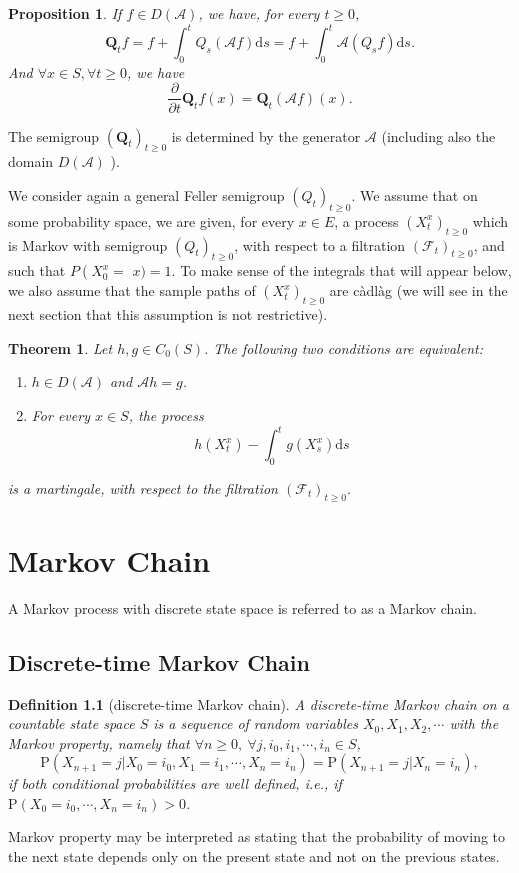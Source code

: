 \documentclass{report}
\newtheorem{definition}{Definition}[section]
\newtheorem{proposition}{Proposition}[section]
\newtheorem{theorem}{Theorem}[section]
\theoremstyle{nonumberplain}
\begin{document}
\begin{proposition}
	If $f\in D(\mathcal{A})$, we have, for every $t \ge 0$,
	\[
		\mathbf{Q}_t f=f+\int_0^t Q_s(\mathcal{A} f) \mathrm{d} s=f+\int_0^t \mathcal{A}\left(Q_s f\right) \mathrm{d} s.
	\] 
	And $\forall x \in S, \forall t \ge 0$, we have
	\[
		\frac{\partial}{\partial t} \mathbf{Q}_t f(x) = \mathbf{Q}_t\left( \mathcal{A}f \right)(x).
	\]
\end{proposition}
The semigroup $\left(\mathbf{Q}_t\right)_{t \ge 0}$ is determined by the generator $\mathcal{A}$ (including also the domain $D(\mathcal{A})$ ).

We consider again a general Feller semigroup $\left(Q_t\right)_{t \geq 0}$. We assume that on some probability space, we are given, for every $x \in E$, a process $\left(X_t^x\right)_{t \geq 0}$ which is Markov with semigroup $\left(Q_t\right)_{t \geq 0}$, with respect to a filtration $\left(\mathcal{F}_t\right)_{t \geq 0}$, and such that $P\left(X_0^x=\right.$ $x)=1$. To make sense of the integrals that will appear below, we also assume that the sample paths of $\left(X_t^x\right)_{t \geq 0}$ are càdlàg (we will see in the next section that this assumption is not restrictive).
\begin{theorem}
	Let $h, g \in C_0(S)$. The following two conditions are equivalent:
	\begin{enumerate}
		\item $h \in D(\mathcal{A})$ and $\mathcal{A} h=g$.
		\item For every $x \in S$, the process
		$$
		h\left(X_t^x\right)-\int_0^t g\left(X_s^x\right) \mathrm{d} s
		$$
	\end{enumerate}
	is a martingale, with respect to the filtration $\left(\mathcal{F}_t\right)_{t \geq 0}$.
\end{theorem}

\chapter{Markov Chain}
A Markov process with discrete state space is referred to as a Markov chain.
\section{Discrete-time Markov Chain}
\begin{definition}[discrete-time Markov chain]
	A \emph{discrete-time Markov chain} on a countable state space $S$ is a sequence of random variables $X_0, X_1, X_2,\cdots$ with the Markov property, namely that $\forall n\ge0,\ \forall j,i_0,i_1,\cdots,i_n\in S$,	
	\[
	\mathrm{P}(X_{n+1}=j| X_{0}=i_{0},X_{1}=i_{1},\cdots,X_{n}=i_{n})=\mathrm{P}(X_{n+1}=j| X_{n}=i_{n}), 
	\] if both conditional probabilities are well defined, i.e., if $ 	\mathrm{P}(X_{0}=i_{0},\cdots ,X_{n}=i_{n})>0$.
\end{definition}	
Markov property may be interpreted as stating that the probability of moving to the next state depends only on the present state and not on the previous states. 
\end{document}
